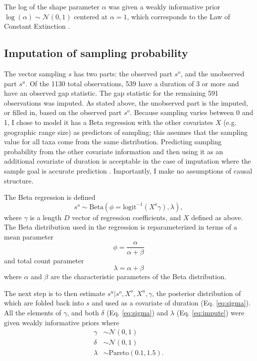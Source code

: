 \documentclass{article}
\begin{document}
The log of the shape parameter \(\alpha\) was given a weakly informative prior \(\log(\alpha) \sim \mathcal{N}(0, 1)\) centered at \(\alpha = 1\), which corresponds to the Law of Constant Extinction \citep{VanValen1973}.

\subsection{Imputation of sampling probability}
\label{sec:impute}
The vector sampling \(s\) has two parts: the observed part \(s^{o}\), and the unobserved part \(s^{u}\). Of the 1130 total observations, 539 have a duration of 3 or more and have an observed gap statistic. The gap statistic for the remaining 591 observations was imputed. As stated above, the unobserved part is the imputed, or filled in, based on the observed part \(s^{o}\). Because sampling varies between 0 and 1, I chose to model it has a Beta regression with the other covariates \(X\) (e.g. geographic range size) as predictors of sampling; this assumes that the sampling value for all taxa come from the same distribution. Predicting sampling probability from the other covariate information and then using it as an additional covariate of duration is acceptable in the case of imputation where the sample goal is accurate prediction \citep{Gelman2007}. Importantly, I make no assumptions of causal structure.

The Beta regression is defined
\begin{equation}
  s^{o} \sim \mathrm{Beta}(\phi = \text{logit}^{-1}(X^{o} \gamma), \lambda),
  \label{eq:impute}
\end{equation}
where \(\gamma\) is a length \(D\) vector of regression coefficients, and \(X\) defined as above. The Beta distribution used in the regression is reparameterized in terms of a mean parameter
\begin{equation}
  \phi = \frac{\alpha}{\alpha + \beta}
\end{equation}
and total count parameter
\begin{equation}
  \lambda = \alpha + \beta
\end{equation}
where \(\alpha\) and \(\beta\) are the characteristic parameters of the Beta distribution.

The next step is to then estimate \(s^{u} | s^{o}, X^{o}, X^{u}, \gamma\), the posterior distribution of which are folded back into \(s\) and used as a covariate of duration (Eq. \ref{eq:sigma}). All the elements of \(\gamma\), and both \(\delta\) (Eq. \ref{eq:sigma}) and \(\lambda\) (Eq. \ref{eq:impute}) were given weakly informative priors where
\begin{equation}
  \begin{aligned}
    \gamma &\sim \mathcal{N}(0, 1) \\
    \delta &\sim \mathcal{N}(0, 1) \\
    \lambda &\sim \mathrm{Pareto}(0.1, 1.5). \\
  \end{aligned}
\end{equation}
\end{document}
